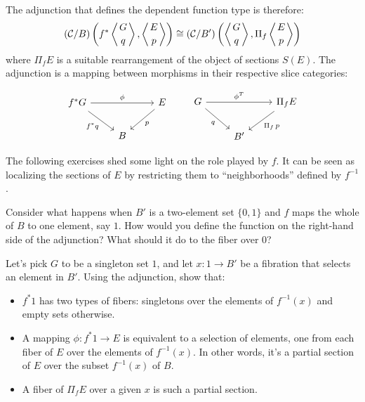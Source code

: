 \documentclass[DaoFP]{subfiles}
\begin{document}
The adjunction that defines the dependent function type is therefore:
\[ (\mathcal{C}/B) \left( f^* \left \langle {G \atop q} \right \rangle, \left \langle {E \atop p} \right \rangle \right) \cong  (\mathcal{C}/B')\left( \left \langle {G \atop q} \right \rangle, \Pi_f \left \langle {E \atop p } \right \rangle \right) \]
where $\Pi_f E$ is a suitable rearrangement of the object of sections $S(E)$. The adjunction is a mapping between morphisms in their respective slice categories:

\[
 \begin{tikzcd}
 f^* G
 \arrow[rr, "\phi"]
 \arrow[rd, "f^* q"']
 &&E
 \arrow[dl, "p"]
 \\
 &B
 \end{tikzcd}
 \hspace{20pt}
\begin{tikzcd}
 G
 \arrow[rr, "\phi^T"]
 \arrow[rd, "q"']
 && \Pi_f E
 \arrow[ld, "\Pi_f \, p"]
 \\
 & B'
  \end{tikzcd}
\]

The following exercises shed some light on the role played by $f$. It can be seen as localizing the sections of $E$ by restricting them to ``neighborhoods'' defined by $f^{-1}$.

\begin{exercise}
Consider what happens when $B'$ is a two-element set $\{0, 1\}$ and $f$ maps the whole of $B$ to one element, say $1$. How would you define the function on the right-hand side of the adjunction? What should it do to the fiber over $0$?
\end{exercise}

\begin{exercise}
Let's pick $G$ to be a singleton set $1$, and let $x \colon 1 \to B'$ be a fibration that selects an element in $B'$. Using the adjunction, show that:
\begin{itemize}
\item $f^* 1$ has two types of fibers: singletons over the elements of $f^{-1} (x)$ and empty sets otherwise. 
\item A mapping $\phi \colon f^* 1 \to E$ is equivalent to a selection of elements, one from each fiber of $E$ over the elements of $f^{-1}(x)$. In other words, it's a partial section of $E$ over the subset $f^{-1}(x)$ of $B$.
\item A fiber of $\Pi_f E$ over a given $x$ is such a partial section. 
\end{itemize}
\end{exercise}
\end{document}
